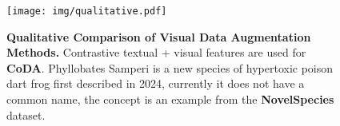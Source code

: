 \begin{figure}[H]
  \centering
  \texttt{[image: img/qualitative.pdf]}

   \caption{\textbf{Qualitative Comparison of Visual Data Augmentation Methods.} Contrastive textual + visual features are used for \textbf{CoDA}. Phyllobates Samperi is a new species of hypertoxic poison dart frog first described in 2024, currently it does not have a common name, the concept is an example from the \textbf{NovelSpecies} dataset.}

   \label{fig:qualitative}
\end{figure}
